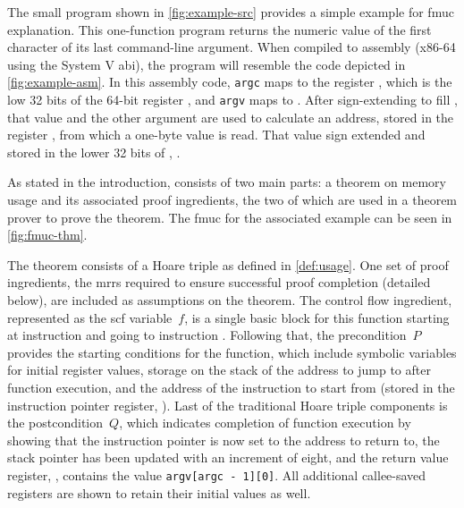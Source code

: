 The small program shown in \cref{fig:example-src} provides a simple example
for \ac{fmuc} explanation. This one-function program
returns the numeric value of the first character of its last command-line argument.
When compiled to assembly (x86-64 using the System V \ac{abi}),
the program will resemble the code depicted in \cref{fig:example-asm}.
In this assembly code,
\lstinline|argc| maps to the register ,
which is the low 32 bits of the 64-bit register ,
and \lstinline|argv| maps to .
After sign-extending  to fill ,
that value and the other argument are used to calculate
an address, stored in the register ,
from which a one-byte value is read.
That value sign extended and stored in the lower 32 bits of ,
.

As stated in the introduction,  consists of two main parts:
a theorem on memory usage and its associated proof ingredients,
the two of which are used in a theorem prover to prove the theorem.
The \ac{fmuc} for the associated example can be seen in \cref{fig:fmuc-thm}.

The theorem consists of a Hoare triple as defined in \cref{def:usage}.
One set of proof ingredients,
the \acp{mrr} required to ensure successful proof completion (detailed below),
are included as assumptions on the theorem.
The control flow ingredient,
represented as the \ac{scf} variable~$f$, is a single basic block for this function
starting at instruction  and going to instruction .
Following that, the precondition~$P$ provides the starting conditions for the function,
which include symbolic variables for initial register values,
storage on the stack of the address to jump to after function execution,
and the address of the instruction to start from
(stored in the instruction pointer register, ).
Last of the traditional Hoare triple components is the postcondition~$Q$,
which indicates completion of function execution
by showing that the instruction pointer is now set to the address to return to,
the stack pointer  has been updated with an increment of eight,
and the return value register, ,
contains the value \lstinline|argv[argc - 1][0]|.
All additional callee-saved registers are shown to retain their initial values as well.

